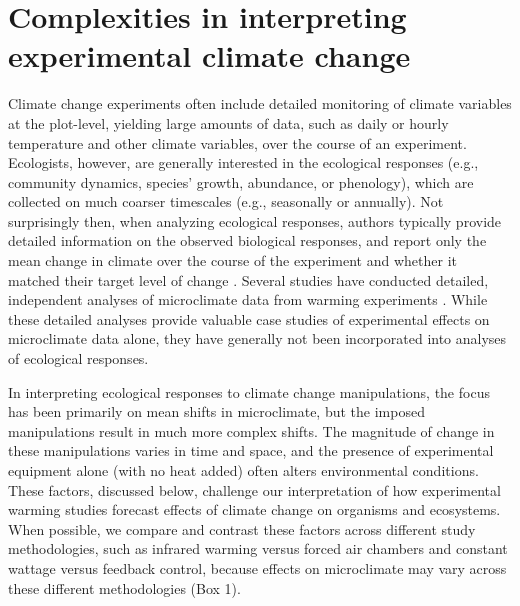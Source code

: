 \documentclass{article}
\begin{document}
\section* {Complexities in interpreting experimental climate change} 
Climate change experiments often include detailed monitoring of climate variables at the plot-level, yielding large amounts of data, such as daily or hourly temperature and other climate variables, over the course of an experiment. Ecologists, however, are generally interested in the ecological responses (e.g., community dynamics, species' growth, abundance, or phenology), which are collected on much coarser timescales (e.g., seasonally or annually). Not surprisingly then, when analyzing ecological responses, authors typically provide detailed information on the observed biological responses, and report only the mean change in climate over the course of the experiment and whether it matched their target level of change \citep[e.g.,][]{price1998,rollinson2012,clark2014a,clark2014b}. Several studies have conducted detailed, independent analyses of microclimate data from warming experiments \citep[e.g.,][]{harte1995b,kimball2005,kimball2008,mcdaniel2014, pelini2011}. While these detailed analyses provide valuable case studies of experimental effects on microclimate data alone, they have generally not been incorporated into analyses of ecological responses. 

\par In interpreting ecological responses to climate change manipulations, the focus has been primarily on mean shifts in microclimate, but the imposed manipulations result in much more complex shifts. The magnitude of change in these manipulations varies in time and space, and the presence of experimental equipment alone (with no heat added) often alters environmental conditions.  These factors, discussed below, challenge our interpretation of how experimental warming studies forecast effects of climate change on organisms and ecosystems. When possible, we compare and contrast these factors across different study methodologies, such as infrared warming versus forced air chambers and constant wattage versus feedback control, because effects on microclimate may vary across these different methodologies (Box 1).
\end{document}
